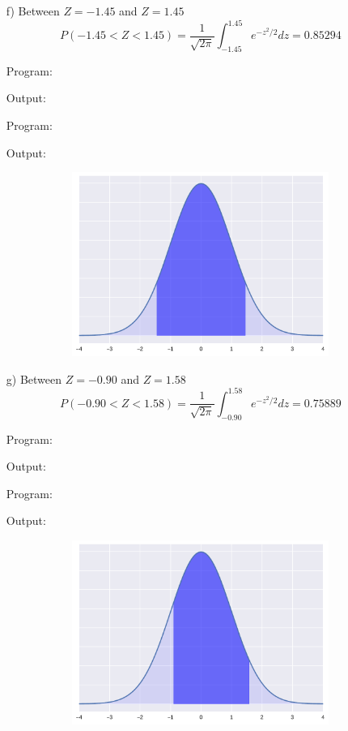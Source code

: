 \documentclass[a4paper,10pt,openright]{report}
\begin{document}
\begin{enumerate}
\begin{enumerate}
\item[f)] Between $Z = -1.45$ and $Z = 1.45$
\begin{equation*}
P(-1.45 < Z < 1.45) = \frac{1}{\sqrt{2\pi}} \int_{-1.45}^{1.45} e^{-z^{2}/2} dz = 0.85294
\end{equation*}

\vspace{0.5cm}

Program:

Output:


\vspace{1cm}

Program:

Output:


\begin{figure}[ht!]
\includegraphics[width=12cm,height=6cm,keepaspectratio]{norm1f.pdf}
\centering
\end{figure}

\item[g)] Between $Z = -0.90$ and $Z = 1.58$
\begin{equation*}
P(-0.90 < Z < 1.58) = \frac{1}{\sqrt{2\pi}} \int_{-0.90}^{1.58} e^{-z^{2}/2} dz = 0.75889
\end{equation*}

\vspace{0.5cm}

Program:

Output:


\vspace{1cm}

Program:

Output:


\begin{figure}[ht!]
\includegraphics[width=12cm,height=6cm,keepaspectratio]{norm1g.pdf}
\centering
\end{figure}
\end{enumerate}


\end{enumerate}
\end{document}
